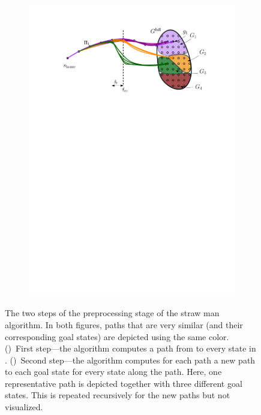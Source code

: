 \documentclass[conference]{IEEEtran}
\begin{document}
\begin{figure}[t]
    \begin{subfigure}{0.225\textwidth}
        \includegraphics[width=\textwidth]{naive2}
        \caption{}
        \label{fig:naive2}
    \end{subfigure}
    \caption{The two steps of the preprocessing stage of the straw man algorithm. In both figures, paths that are very similar (and their corresponding goal states) are depicted using the same color.
    ()~First step---the algorithm computes a path from \Shome to every state in \Gfull.
    ()~Second step---the algorithm computes for each path a new path to each goal state for every state along the path. Here, one representative path is depicted together with three different goal states. 
    This is repeated recursively for the new paths but not visualized.}
    \label{fig:naive}
\end{figure}
\end{document}
